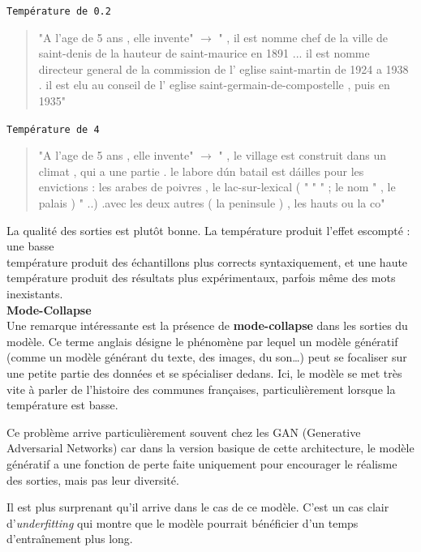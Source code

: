 \noindent{} \texttt{Température de 0.2}

\begin{quotation}
"A l'age de 5 ans , elle invente" $\rightarrow$ " , il est nomme chef de la ville de saint-denis de la hauteur de saint-maurice en 1891 ... il est nomme directeur general de la commission de l' eglise saint-martin de 1924 a 1938 . il est elu au conseil de l' eglise saint-germain-de-compostelle , puis en 1935"
\end{quotation}

\noindent{} \texttt{Température de 4}

\begin{quotation}
"A l'age de 5 ans , elle invente" $\rightarrow$ " , le village est construit dans un climat , qui a une partie . le labore d\' un batail est d\' ailles pour les envictions : les arabes de poivres , le lac-sur-lexical ( " " " ; le nom " , le palais ) " ..) .avec les deux autres ( la peninsule ) , les hauts ou la co"
\end{quotation}

La qualité des sorties est plutôt bonne. La température produit l'effet
escompté : une basse \\
température produit des échantillons plus corrects
syntaxiquement, et une haute température produit des résultats plus
expérimentaux, parfois même des mots inexistants. \\

\textbf{Mode-Collapse} \\

Une remarque intéressante est la présence de \textbf{mode-collapse} dans
les sorties du modèle. Ce terme anglais désigne le phénomène par lequel
un modèle génératif (comme un modèle générant du texte, des images, du
son\ldots{}) peut se focaliser sur une petite partie des données et se
spécialiser dedans. Ici, le modèle se met très vite à parler de
l'histoire des communes françaises, particulièrement lorsque la
température est basse.

Ce problème arrive particulièrement souvent chez les GAN (Generative
Adversarial Networks) car dans la version basique de cette architecture,
le modèle génératif a une fonction de perte faite uniquement pour
encourager le réalisme des sorties, mais pas leur diversité.

Il est plus surprenant qu'il arrive dans le cas de ce modèle. C'est un
cas clair d'\emph{underfitting} qui montre que le modèle pourrait
bénéficier d'un temps d'entraînement plus long.







